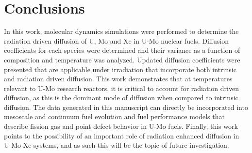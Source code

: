 \documentclass[review]{elsarticle}
\begin{document}

\section{Conclusions}

In this work, molecular dynamics simulations were performed to determine the radiation driven diffusion of U, Mo and Xe in U-Mo nuclear fuels. Diffusion coefficients for each species were determined and their variance as a function of composition and temperature was analyzed. Updated diffusion coefficients were presented that are applicable under irradiation that incorporate both intrinsic and radiation driven diffusion. This work demonstrates that at temperatures relevant to U-Mo research reactors, it is critical to account for radiation driven diffusion, as this is the dominant mode of diffusion when compared to intrinsic diffusion. The data generated in this manuscript can directly be incorporated into mesoscale and continuum fuel evolution and fuel performance models that describe fission gas and point defect behavior in U-Mo fuels. Finally, this work points to the possibility of an important role of radiation enhanced diffusion in U-Mo-Xe systems, and as such this will be the topic of future investigation. 
\end{document}
